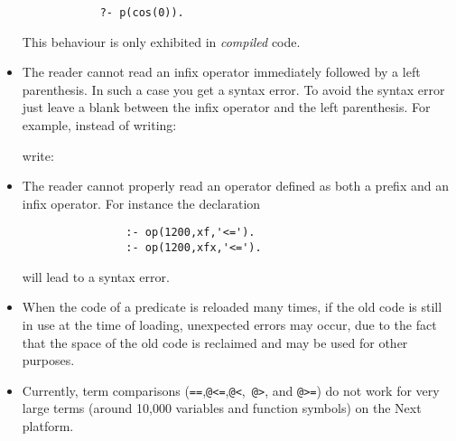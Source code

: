 \begin{itemize}
\begin{verbatim}
            ?- p(cos(0)).
      \end{verbatim}
      This behaviour is only exhibited in {\em compiled} code.
\item The reader cannot read an infix operator immediately followed 
       by a left parenthesis.  In such a case you get a
      syntax error.  To avoid the syntax error just leave a blank between the
      infix operator and the left parenthesis.  For example, instead of 
      writing:


      \noindent
      write:

%
\item The reader cannot properly read an operator defined as both a
prefix and an infix operator.  For instance the declaration 
\begin{verbatim}
                :- op(1200,xf,'<=').
                :- op(1200,xfx,'<=').
\end{verbatim}
will lead to a syntax error.
%
\item When the code of a predicate is reloaded many times, if the old 
      code is still in use at the time of loading, unexpected errors may 
      occur, due to the fact that the space of the old code is reclaimed
      and may be used for other purposes.
\item Currently, term comparisons ({\tt ==},{\tt @<=},{\tt @<},{\tt
      @>}, and {\tt @>=}) do not work for very large terms (around
      10,000 variables and function symbols) on the Next platform.
\end{itemize}

